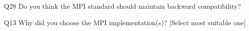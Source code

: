 \begin{description}%
\item{Q28} Do you think the MPI standard should maintain backward compatibility?%
\item{Q13} Why did you choose the MPI implementation(s)? [Select most suitable one]%
\end{description}%
